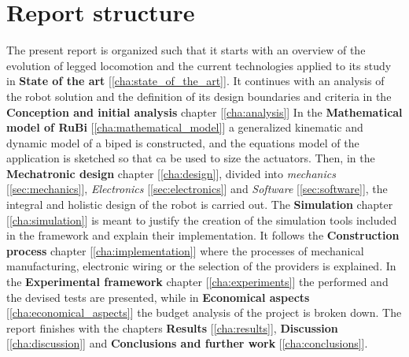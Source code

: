 \section{Report structure}
\label{sec:report_structure}
The present report is organized such that it starts with an overview of the evolution of legged locomotion and the current technologies applied to its study in \textbf{State of the art} [\ref{cha:state_of_the_art}].
It continues with an analysis of the robot solution and the definition of its design boundaries and criteria in the \textbf{Conception and initial analysis} chapter [\ref{cha:analysis}]
In the \textbf{Mathematical model of RuBi} [\ref{cha:mathematical_model}] a generalized kinematic and dynamic model of a biped is constructed, and the equations model of the application is sketched so that ca be used to size the actuators.
Then, in  the \textbf{Mechatronic design} chapter [\ref{cha:design}], divided into \textit{mechanics} [\ref{sec:mechanics}], \textit{Electronics} [\ref{sec:electronics}] and \textit{Software} [\ref{sec:software}], the integral and holistic design of the robot is carried out.
The \textbf{Simulation} chapter [\ref{cha:simulation}] is meant to justify the creation of the simulation tools included in the framework and explain their implementation.
It follows the \textbf{Construction process} chapter [\ref{cha:implementation}] where the processes of mechanical manufacturing, electronic wiring or the selection of the providers is explained.
In the \textbf{Experimental framework} chapter [\ref{cha:experiments}] the performed and the devised tests are presented, while in \textbf{Economical aspects} [\ref{cha:economical_aspects}] the budget analysis of the project is broken down.
The report finishes with the chapters \textbf{Results} [\ref{cha:results}], \textbf{Discussion} [\ref{cha:discussion}] and \textbf{Conclusions and further work} [\ref{cha:conclusions}].
